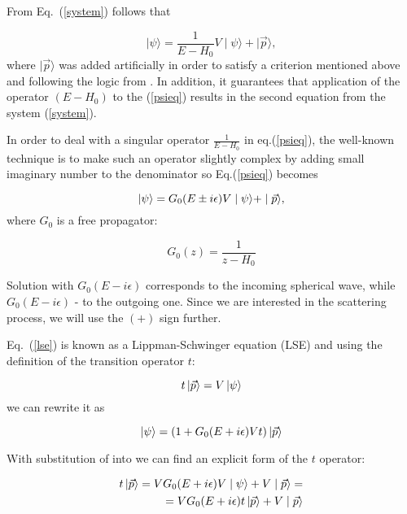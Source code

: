     From Eq.~(\ref{system}) follows that

    \begin{equation}
        \mid \psi \rangle = \frac{1}{E - H_0}V \mid \psi \rangle +  \mid \vec{p} \rangle,
        \label{psieq}
    \end{equation}
    where $\mid \vec{p} \rangle$ was added artificially in order to satisfy a criterion mentioned above 
    and following the logic from \cite{Sakurai}. In addition, it guarantees that
     application of the operator $(E -H_0)$ to the 
    (\ref{psieq}) results in the second equation from the system (\ref{system}).

    In order to deal with a singular operator $\frac{1}{E - H_0}$ in eq.(\ref{psieq}), the well-known
    technique is to make such an operator slightly complex by adding small imaginary number to the denominator
    so Eq.(\ref{psieq}) becomes

    \begin{equation}
        \ket{\psi} = G_0(E \pm i\epsilon)V \mid \psi \rangle +  \mid \vec{p} \rangle,
        \label{lse}
    \end{equation}
    where $G_0$ is a free propagator:

    \begin{equation}
        G_0(z) = \frac{1}{z - H_0}
    \end{equation}

    Solution with $G_0(E - i\epsilon)$ corresponds to the incoming spherical wave,
    while $G_0(E - i\epsilon)$ - to the outgoing one. Since we are interested in the scattering
    process, we will use the $(+)$ sign further.
    
    Eq.~(\ref{lse}) is known as a Lippman-Schwinger equation (LSE) and using
    the definition of the transition operator $t$:

    \begin{equation}
        t \ket{\vec{p}} = V \ket{\psi}
        \label{t-op}
    \end{equation}
    we can rewrite it as 

    \begin{equation}
        \ket{\psi} = (1 + G_0(E + i\epsilon)V t)  \ket {\vec{p}}
        \label{psi_toper}
    \end{equation}

    With substitution of  into  we can find
    an explicit form of the $t$ operator:

    \begin{eqnarray}
        t \ket{\vec{p}} = V G_0(E + i\epsilon)V \mid \psi \rangle +  V \mid \vec{p} \rangle = \nonumber\\
        = V G_0(E + i\epsilon) t \ket{\vec{p}} +  V \mid \vec{p} \rangle
        \label{top2}
    \end{eqnarray}

